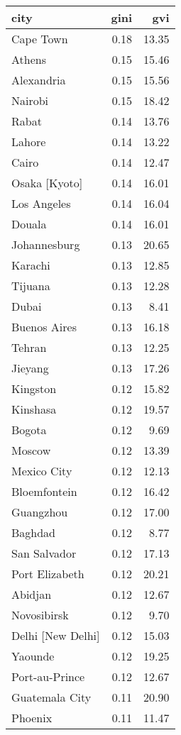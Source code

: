 \begin{longtable}{lrr}
  \hline
city & gini & gvi \\ 
  \hline
Cape Town & 0.18 & 13.35 \\ 
  Athens & 0.15 & 15.46 \\ 
  Alexandria & 0.15 & 15.56 \\ 
  Nairobi & 0.15 & 18.42 \\ 
  Rabat & 0.14 & 13.76 \\ 
  Lahore & 0.14 & 13.22 \\ 
  Cairo & 0.14 & 12.47 \\ 
  Osaka [Kyoto] & 0.14 & 16.01 \\ 
  Los Angeles & 0.14 & 16.04 \\ 
  Douala & 0.14 & 16.01 \\ 
  Johannesburg & 0.13 & 20.65 \\ 
  Karachi & 0.13 & 12.85 \\ 
  Tijuana & 0.13 & 12.28 \\ 
  Dubai & 0.13 & 8.41 \\ 
  Buenos Aires & 0.13 & 16.18 \\ 
  Tehran & 0.13 & 12.25 \\ 
  Jieyang & 0.13 & 17.26 \\ 
  Kingston & 0.12 & 15.82 \\ 
  Kinshasa & 0.12 & 19.57 \\ 
  Bogota & 0.12 & 9.69 \\ 
  Moscow & 0.12 & 13.39 \\ 
  Mexico City & 0.12 & 12.13 \\ 
  Bloemfontein & 0.12 & 16.42 \\ 
  Guangzhou & 0.12 & 17.00 \\ 
  Baghdad & 0.12 & 8.77 \\ 
  San Salvador & 0.12 & 17.13 \\ 
  Port Elizabeth & 0.12 & 20.21 \\ 
  Abidjan & 0.12 & 12.67 \\ 
  Novosibirsk & 0.12 & 9.70 \\ 
  Delhi [New Delhi] & 0.12 & 15.03 \\ 
  Yaounde & 0.12 & 19.25 \\ 
  Port-au-Prince & 0.12 & 12.67 \\ 
  Guatemala City & 0.11 & 20.90 \\ 
  Phoenix & 0.11 & 11.47 \\ 

\end{longtable}
